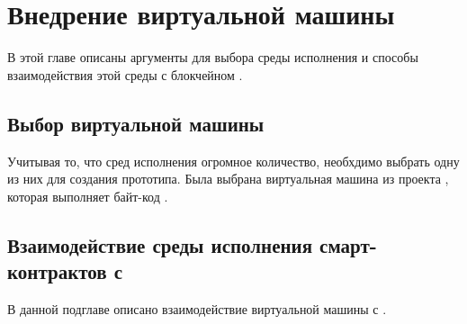 \section{Внедрение виртуальной машины}
В этой главе описаны аргументы для выбора среды исполнения и способы взаимодействия этой среды с блокчейном .

\subsection{Выбор виртуальной машины}
Учитывая то, что сред исполнения огромное количество, необхдимо выбрать одну из них для создания прототипа.
Была выбрана виртуальная машина из проекта , которая выполняет байт-код .

\subsection{Взаимодействие среды исполнения смарт-кон\-трак\-тов с }
В данной подглаве описано взаимодействие виртуальной машины  с .


